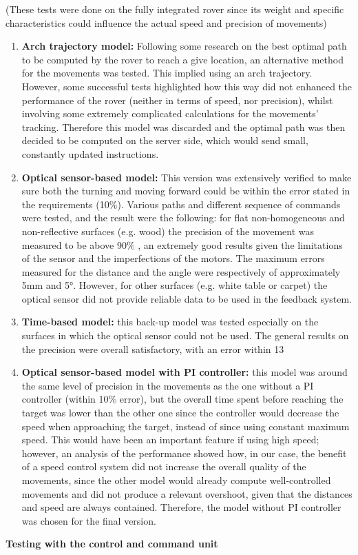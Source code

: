 \documentclass[10pt,twoside]{article}
\begin{document}
(These tests were done on the fully integrated rover since its weight and specific characteristics could influence the actual speed and precision of movements)
\begin{enumerate}
    \item \textbf{Arch trajectory model:} Following some research on the best optimal path to be computed by the rover to reach a give location, an alternative method for the movements was tested. This implied using an arch trajectory. However, some successful tests highlighted how this way did not enhanced the performance of the rover (neither in terms of speed, nor precision), whilst involving some extremely complicated calculations for the movements’ tracking. Therefore this model was discarded and the optimal path was then decided to be computed on the server side, which would send small, constantly updated instructions.
	\item \textbf{Optical sensor-based model:} This version was extensively verified to make sure both the turning and moving forward could be within the error stated in the requirements (10\%). Various paths and different sequence of commands were tested, and the result were the following: for flat non-homogeneous and non-reflective surfaces (e.g. wood) the precision of the movement was measured to be above 90\% , an extremely good results given the limitations of the sensor and the imperfections of the motors. The maximum errors measured for the distance and the angle were respectively of approximately 5mm and 5°. However, for other surfaces (e.g. white table or carpet) the optical sensor did not provide reliable data to be used in the feedback system.
	\item \textbf{Time-based model:} this back-up model was tested especially on the surfaces in which the optical sensor could not be used. The general results on the precision were overall satisfactory, with an error within 13%
	\item \textbf{Optical sensor-based model with PI controller:} this model was around the same level of precision in the movements as the one without a PI controller (within 10\% error), but the overall time spent before reaching the target was lower than the other one since the controller would decrease the speed when approaching the target, instead of since using constant maximum speed. This would have been an important feature if using high speed; however, an analysis of the performance showed how, in our case, the benefit of a speed control system did not increase the overall quality of the movements, since the other model would already compute well-controlled movements and did not produce a relevant overshoot, given that the distances and speed are always contained. Therefore, the model without PI controller was chosen for the final version.
\end{enumerate}
\textbf{Testing with the control and command unit}
\end{document}
